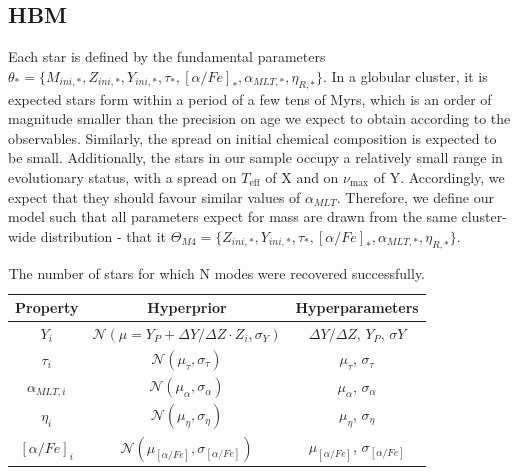 \documentclass[fleqn,usenatbib]{mnras}
\newcommand{\numax}{\nu_{\mathrm{max}}}
\newcommand{\Teff}{T_{\mathrm{eff}}}
\begin{document}
\subsection{HBM}
Each star is defined by the fundamental parameters $\theta_{*} = \{M_{ini, *}, Z_{ini, *}, Y_{ini, *}, \tau_{*}, [\alpha/Fe]_{*}, \alpha_{MLT, *}, \eta_{R, *}\}$. In a globular cluster, it is expected stars form within a period of a few tens of Myrs, which is an order of magnitude smaller than the precision on age we expect to obtain according to the observables. Similarly, the spread on initial chemical composition is expected to be small. Additionally, the stars in our sample occupy a relatively small range in evolutionary status, with a spread on $\Teff$ of X and on $\numax$ of Y. Accordingly, we expect that they should favour similar values of $\alpha_{MLT}$. Therefore, we define our model such that all parameters expect for mass are drawn from the same cluster-wide distribution - that it $\Theta_{M4} = \{Z_{ini, *}, Y_{ini, *}, \tau_{*}, [\alpha/Fe]_{*}, \alpha_{MLT, *}, \eta_{R, *}\}$.
\begin{table}
    \begin{center}
        
        \begin{tabular}{|c|c|c|}%
                \hline
                Property& Hyperprior & Hyperparameters \\
                \hline
                $Y_{i}$ & $\mathcal{N}(\mu = Y_{P} + \Delta Y/\Delta Z \cdot Z_{i}, \sigma_{Y})$ & $\Delta Y/\Delta Z$, $Y_{P}$, $\sigma Y$\\
                $\tau_i$ & $\mathcal{N}(\mu_{\tau}, \sigma_{\tau})$ & $\mu_{\tau}$, $\sigma_{\tau}$\\
                $\alpha_{MLT, i}$ & $\mathcal{N}(\mu_{\alpha}, \sigma_{\alpha})$ & $\mu_{\alpha}$, $\sigma_{\alpha}$\\
                $\eta_{i}$ & $\mathcal{N}(\mu_{\eta}, \sigma_{\eta})$ & $\mu_{\eta}$, $\sigma_{\eta}$\\
                $[\alpha/Fe]_{i}$ & $\mathcal{N}(\mu_{[\alpha/Fe]}, \sigma_{[\alpha/Fe]})$ & $\mu_{[\alpha/Fe]}$, $\sigma_{[\alpha/Fe]}$\\ 
                \hline

        \end{tabular}
        \caption{The number of stars for which N modes were recovered successfully.}
        \label{tab:recovery}
        \end{center}
\end{table}
\end{document}
